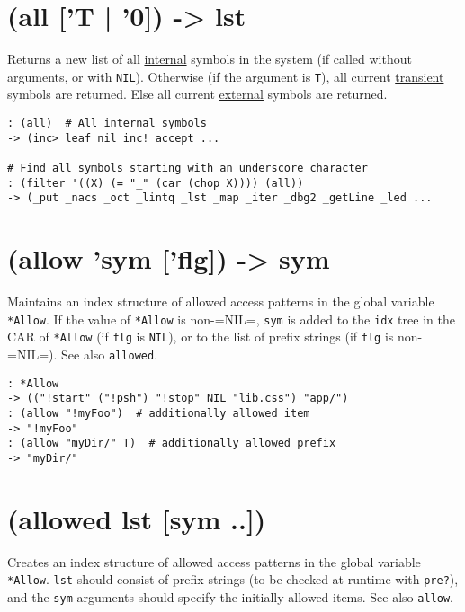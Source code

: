  
\section{(all ['T | '0]) -> lst}
\label{sec-8-1-1-14}


Returns a new list of all \hyperref[ref.html-internal]{internal} symbols in the
system (if called without arguments, or with \texttt{NIL}). Otherwise (if the
argument is \texttt{T}), all current \hyperref[ref.html-transient]{transient} symbols
are returned. Else all current \hyperref[ref.html-external]{external} symbols
are returned.


\begin{verbatim}
: (all)  # All internal symbols
-> (inc> leaf nil inc! accept ...

# Find all symbols starting with an underscore character
: (filter '((X) (= "_" (car (chop X)))) (all))
-> (_put _nacs _oct _lintq _lst _map _iter _dbg2 _getLine _led ...
\end{verbatim}

 
\section{(allow 'sym ['flg]) -> sym}
\label{sec-8-1-1-15}


Maintains an index structure of allowed access patterns in the global
variable \texttt{*Allow}. If the value of \texttt{*Allow} is non-=NIL=, \texttt{sym} is added
to the \texttt{idx} tree in the CAR of \texttt{*Allow} (if \texttt{flg} is \texttt{NIL}), or to the
list of prefix strings (if \texttt{flg} is non-=NIL=). See also \texttt{allowed}.


\begin{verbatim}
: *Allow
-> (("!start" ("!psh") "!stop" NIL "lib.css") "app/")
: (allow "!myFoo")  # additionally allowed item
-> "!myFoo"
: (allow "myDir/" T)  # additionally allowed prefix
-> "myDir/"
\end{verbatim}

 
\section{(allowed lst [sym ..])}
\label{sec-8-1-1-16}


Creates an index structure of allowed access patterns in the global
variable \texttt{*Allow}. \texttt{lst} should consist of prefix strings (to be checked
at runtime with \texttt{pre?}), and the \texttt{sym} arguments should specify the
initially allowed items. See also \texttt{allow}.


